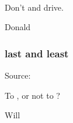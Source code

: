 \documentclass[aspectratio=169]{beamer}
\title{\deliv{\pp}{Presentation}}
\date{\datepp}
\begin{document}

\begin{frame}
\maketitle
\begin{center}
\names \\
\epigraph{Don't \tex{} and drive.}{Donald}
\end{center}
\end{frame}

\begin{frame}
\tableofcontents
\end{frame}









\begin{frame}
\frametitle{last and least}
Source: \github
\epigraph{To \cry, or not to \cry?}{Will}
\end{frame}

\end{document}

